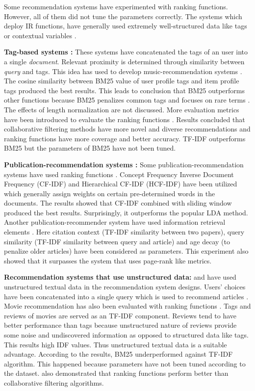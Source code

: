 \documentclass[11pt]{article}
\begin{document}
	Some recommendation systems have experimented with ranking functions. However, all of them did not tune the parameters correctly. The systems which deploy IR functions, have generally used extremely well-structured data like tags \cite{course} or contextual variables \cite{Kwon}. 
	
	\textbf{Tag-based systems :} These systems have concatenated the tags of an user into a single \textit{document}. Relevant proximity is determined through similarity between \textit{query} and tags. This idea has used to develop music-recommendation systems \cite{Cantador,Bellogin}. The cosine similarity between BM25 value of user profile tags and item profile tags produced the best results. This leads to conclusion that BM25 outperforms other functions because BM25 penalizes common tags and focuses on rare terms \cite{Cantador}. The effects of length normalization are not discussed. More evaluation metrics have been introduced to evaluate the ranking functions \cite{Bellogin}. Results concluded that collaborative filtering methods have more novel and diverse recommendations and ranking functions have more coverage and better accuracy. TF-IDF outperforms BM25 but the parameters of BM25 have not been tuned. 
	
	\textbf{Publication-recommendation systems :} Some publication-recommendation systems have used ranking functions \cite{twitter}. Concept Frequency Inverse Document
	Frequency (CF-IDF) and  Hierarchical CF-IDF (HCF-IDF) have been utilized which generally assign weights on certain pre-determined words in the documents. The results showed that CF-IDF combined with sliding window produced the best results. Surprisingly, it outperforms the popular LDA method. Another publication-recommender system have used information retrieval elements \cite{Totti}. Here citation context (TF-IDF similarity between two papers), query similarity (TF-IDF similarity between query and article) and age decay (to penalize older articles) have been considered as parameters. This experiment also showed that it surpasses the system that uses page-rank like metrics.
	
	\textbf{Recommendation systems that use unstructured data:}  and  have used unstructured textual data in the recommendation system designs. Users' choices have been concatenated into a single query which is used to recommend articles \cite{Suchal}. Movie recommendation has also been evaluated with ranking functions \cite{Esparza}. Tags and reviews of movies are served as an TF-IDF component. Reviews tend to have better performance than tags because unstructured nature  of reviews provide some noise and undiscovered information as opposed to structured data like tags. This results high IDF values. Thus unstructured textual data is a suitable advantage. According to the results, BM25 underperformed against TF-IDF algorithm. This happened because parameters have not been tuned according to the dataset.  also demonstrated that ranking functions perform better than collaborative filtering algorithms.
	
\end{document}
